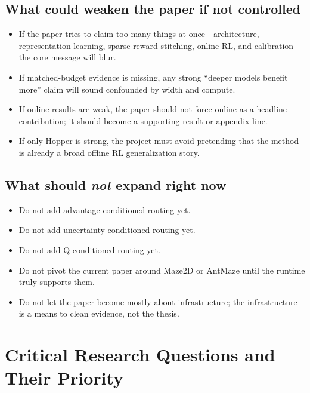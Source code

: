 \documentclass[11pt]{article}
\begin{document}
\subsection{What could weaken the paper if not controlled}

\begin{itemize}
  \item If the paper tries to claim too many things at once---architecture, representation learning, sparse-reward stitching, online RL, and calibration---the core message will blur.
  \item If matched-budget evidence is missing, any strong ``deeper models benefit more'' claim will sound confounded by width and compute.
  \item If online results are weak, the paper should not force online as a headline contribution; it should become a supporting result or appendix line.
  \item If only Hopper is strong, the project must avoid pretending that the method is already a broad offline RL generalization story.
\end{itemize}

\subsection{What should \emph{not} expand right now}

\begin{itemize}
  \item Do not add advantage-conditioned routing yet.
  \item Do not add uncertainty-conditioned routing yet.
  \item Do not add Q-conditioned routing yet.
  \item Do not pivot the current paper around Maze2D or AntMaze until the runtime truly supports them.
  \item Do not let the paper become mostly about infrastructure; the infrastructure is a means to clean evidence, not the thesis.
\end{itemize}

\section{Critical Research Questions and Their Priority}
\end{document}
